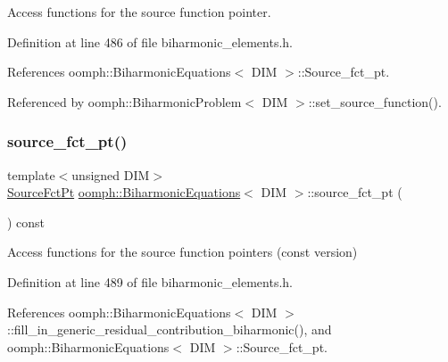 Access functions for the source function pointer. 



Definition at line 486 of file biharmonic\+\_\+elements.\+h.



References oomph\+::\+Biharmonic\+Equations$<$ D\+I\+M $>$\+::\+Source\+\_\+fct\+\_\+pt.



Referenced by oomph\+::\+Biharmonic\+Problem$<$ D\+I\+M $>$\+::set\+\_\+source\+\_\+function().

\mbox{\label{classoomph_1_1BiharmonicEquations_afc6b6019723e9915af2013eb911235e4}} 
\subsubsection{\texorpdfstring{source\+\_\+fct\+\_\+pt()}{source\_fct\_pt()}\hspace{0.1cm}{\footnotesize\ttfamily [2/2]}}
{\footnotesize\ttfamily template$<$unsigned D\+IM$>$ \\
\hyperlink{classoomph_1_1BiharmonicEquations_aafa48cd7bbc8ce4383224d1d2d0bfda3}{Source\+Fct\+Pt} \hyperlink{classoomph_1_1BiharmonicEquations}{oomph\+::\+Biharmonic\+Equations}$<$ D\+IM $>$\+::source\+\_\+fct\+\_\+pt (\begin{DoxyParamCaption}{ }\end{DoxyParamCaption}) const\hspace{0.3cm}{\ttfamily [inline]}}



Access functions for the source function pointers (const version) 



Definition at line 489 of file biharmonic\+\_\+elements.\+h.



References oomph\+::\+Biharmonic\+Equations$<$ D\+I\+M $>$\+::fill\+\_\+in\+\_\+generic\+\_\+residual\+\_\+contribution\+\_\+biharmonic(), and oomph\+::\+Biharmonic\+Equations$<$ D\+I\+M $>$\+::\+Source\+\_\+fct\+\_\+pt.

\mbox{\label{classoomph_1_1BiharmonicEquations_aebe4e72a90f24cde0f34cf14287e3721}} 
